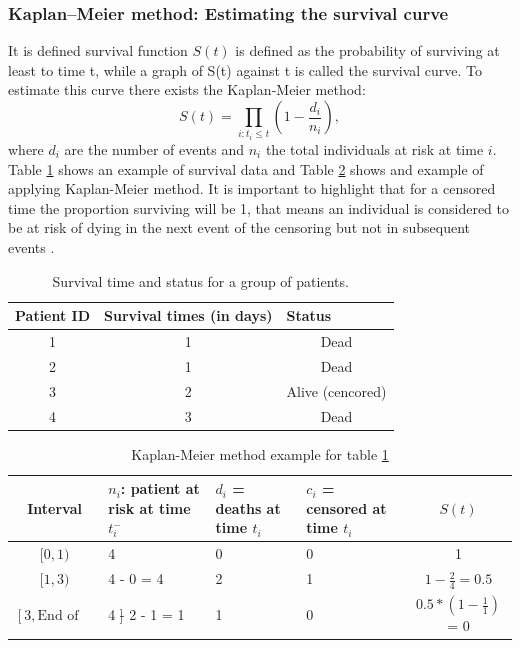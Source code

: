 \subsubsection{Kaplan–Meier method: Estimating the survival curve}

It is defined  survival function $S(t)$ is defined as the
probability of surviving at least to time t, while a
 graph of S(t) against t is called the survival curve.
To estimate this curve there exists the Kaplan-Meier method:
$$ S(t) = \prod_{i: t_i\leq t}\left(1 - \frac{d_i}{n_i}\right),$$
 where $d_{i}$ are the number of events and  $n_{i}$
the total individuals at risk at time $i$. Table \ref{survival-example} shows
an example of survival data and Table \ref{Kaplan-Meier-example} shows
and example of applying Kaplan-Meier method. It is important to highlight that
for a censored time the proportion surviving will be 1, that means
an individual is considered to be at risk of dying in the next event of the censoring
but not in subsequent events \cite{bland2004logrank}.

\begin{table}[h!]
\centering
\caption[Survival time example]{Survival time and status for a group of patients.}
\label{survival-example}
\begin{tabular}{ccc}
\hline
\multicolumn{1}{l}{\textbf{Patient ID}} & \multicolumn{1}{l}{\textbf{Survival times (in days)}} & \multicolumn{1}{l}{\textbf{Status}} \\ \hline
1 & 1 & Dead \\
2 & 1 & Dead \\
3 & 2 & Alive (cencored) \\
4 & 3 & Dead \\ \hline
\end{tabular}
\end{table}

\begin{table}[h!]
\centering
\caption[Kaplan-Meier method  example]{Kaplan-Meier method example for table \ref{survival-example}}
\label{Kaplan-Meier-example}
\begin{tabular}{cp{3cm}p{3cm}p{3cm}c}
\hline
\textbf{Interval} & \textbf{$n_i$: patient at risk at time $t_i^-$} &
\textbf{$d_i$ = deaths at time $t_i$} &
\textbf{$c_i$ = censored at time $t_i$} &  \textbf{$S(t)$}  \\ \hline
$[0,1)$ & 4          & 0 & 0 & 1 \\
$[1,3)$ & 4 - 0 = 4  & 2 & 1 & $1 - \frac{2}{4} = 0.5$ \\
$[3,\textrm{End of study}]$  & 4 - 2 - 1 = 1  & 1 & 0 & $0.5 * (1 - \frac{1}{1})$ = 0 \\ \hline
\end{tabular}
\end{table}


